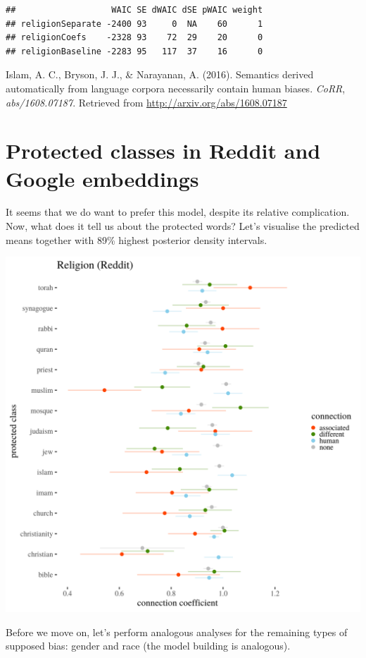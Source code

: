 \documentclass[12pt,]{book}
\begin{document}
\begin{verbatim}
##                   WAIC SE dWAIC dSE pWAIC weight
## religionSeparate -2400 93     0  NA    60      1
## religionCoefs    -2328 93    72  29    20      0
## religionBaseline -2283 95   117  37    16      0
\end{verbatim}

\leavevmode\hypertarget{ref-Caliskan2017Semantics}{}%
Islam, A. C., Bryson, J. J., \& Narayanan, A. (2016). Semantics derived automatically from language corpora necessarily contain human biases. \emph{CoRR}, \emph{abs/1608.07187}. Retrieved from \url{http://arxiv.org/abs/1608.07187}

\section{Protected classes in Reddit and Google
embeddings}\label{protected-classes-in-reddit-and-google-embeddings}

It seems that we do want to prefer this model, despite its relative
complication. Now, what does it tell us about the protected words? Let's
visualise the predicted means together with 89\% highest posterior
density intervals.

\includegraphics[width=14cm]{../images/visReligionReddit.png}

Before we move on, let's perform analogous analyses for the remaining
types of supposed bias: gender and race (the model building is
analogous).
\end{document}
